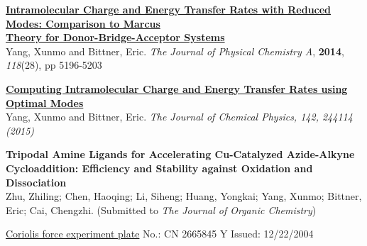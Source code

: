 \documentclass[12pt,letterpaper]{article}
\newcommand{\mhead}[1]{\leavevmode\marginpar{\sffamily\footnotesize #1}}
\begin{document}
\bigskip
\mhead{Publications}%
\href{http://pubs.acs.org/doi/abs/10.1021/jp503041y}{\textbf{Intramolecular Charge and Energy Transfer Rates with Reduced Modes: Comparison to Marcus}}\\ 
\href{http://pubs.acs.org/doi/abs/10.1021/jp503041y}{\textbf{Theory for Donor-Bridge-Acceptor Systems}}\\
Yang, Xunmo and Bittner, Eric. \emph{The Journal of Physical Chemistry A}, \textbf{2014}, \emph{118}(28), pp 5196-5203

\href{http://scitation.aip.org/content/aip/journal/jcp/142/24/10.1063/1.4923191}{\textbf{Computing Intramolecular Charge and Energy Transfer Rates using Optimal Modes}}\\ 
Yang, Xunmo and Bittner, Eric. \emph{The Journal of Chemical Physics, \emph{142}, 244114 (2015)}

\smallskip
\textbf{Tripodal Amine Ligands for Accelerating Cu-Catalyzed Azide-Alkyne Cycloaddition: Efficiency and Stability against Oxidation and Dissociation}\\
Zhu, Zhiling; Chen, Haoqing; Li, Siheng; Huang, Yongkai; Yang, Xunmo; Bittner, Eric; Cai, Chengzhi. (Submitted to \emph{The Journal of Organic Chemistry})


\bigskip
\mhead{Patent}%
\href{https://www.google.com/patents/CN2665845Y?cl=en}{Coriolis force experiment plate} \quad\quad\quad\quad No.: CN 2665845 Y  \quad\quad\quad\quad Issued: 12/22/2004 


\end{document}
